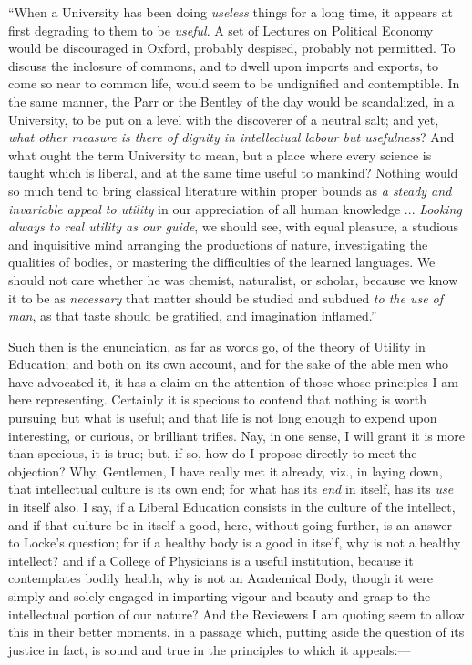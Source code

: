 ``When a University has been doing \emph{useless} things for
a long time, it appears at first degrading to them to be \emph{useful}.
A set of Lectures on Political Economy would be discouraged in Oxford,
probably despised, probably not permitted. To discuss the inclosure of
commons, and to dwell upon imports and exports, to come so near to
common life, would seem to be undignified and contemptible. In the
same manner, the Parr or the Bentley of the day would be scandalized,
in a University, to be put on a level with the discoverer of a neutral
salt; and yet, \emph{what other measure is there of dignity in
intellectual labour but usefulness}? And what ought the term
University to mean, but a place where every science is taught which is
liberal, and at the same time useful to mankind? Nothing would so much
tend to bring classical literature within proper bounds as \emph{a steady
and invariable appeal to utility} in our appreciation of all human
knowledge ... \emph{Looking always to real utility as our guide}, we
should see, with equal pleasure, a studious and inquisitive mind
arranging the productions of nature, investigating the qualities of
bodies, or mastering the difficulties of the learned languages. We
should not care whether he was chemist, naturalist, or scholar,
because we know it to be as \emph{necessary} that matter should be
studied and subdued \emph{to the use of man}, as that taste should be
gratified, and imagination inflamed.''

Such then is the enunciation, as far as words go, of the theory of
Utility in Education; and both on its own account, and for the sake of
the able men who have advocated it, it has a claim on the attention of
those whose principles I am here representing. Certainly it is
specious to contend that nothing is worth pursuing but what is useful;
and that life is not long enough to expend upon interesting, or
curious, or brilliant trifles. Nay, in one sense, I will grant
it is more than specious, it is true; but, if so, how do I propose
directly to meet the objection? Why, Gentlemen, I have really met it
already, viz., in laying down, that intellectual culture is its own
end; for what has its \emph{end} in itself, has its \emph{use} in
itself also. I say, if a Liberal Education consists in the culture of
the intellect, and if that culture be in itself a good, here, without
going further, is an answer to Locke's question; for if a healthy body
is a good in itself, why is not a healthy intellect? and if a College
of Physicians is a useful institution, because it contemplates bodily
health, why is not an Academical Body, though it were simply and
solely engaged in imparting vigour and beauty and grasp to the
intellectual portion of our nature? And the Reviewers I am quoting
seem to allow this in their better moments, in a passage which,
putting aside the question of its justice in fact, is sound and true
in the principles to which it appeals:—

